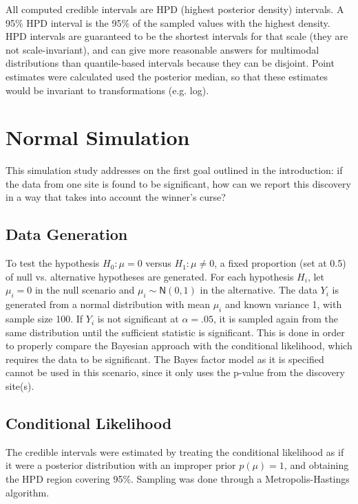 \documentclass[AMA,STIX1COL]{WileyNJD-v2}\usepackage[]{graphicx}\usepackage[]{color}
\begin{document}
All computed credible intervals are HPD (highest posterior density) intervals. A 95\% HPD interval is the 95\% of the sampled values with the highest density. HPD intervals are guaranteed to be the shortest intervals for that scale (they are not scale-invariant), and can give more reasonable answers for multimodal distributions than quantile-based intervals because they can be disjoint. Point estimates were calculated used the posterior median, so that these estimates would be invariant to transformations (e.g. log).

\section{Normal Simulation}\label{sec:normal}

This simulation study addresses on the first goal outlined in the introduction: if the data from one site is found to be significant, how can we report this discovery in a way that takes into account the winner's curse? 

\subsection{Data Generation}

To test the hypothesis $H_0: \mu = 0$ versus  $H_1: \mu \neq 0$, a fixed proportion (set at 0.5) of null vs. alternative hypotheses are generated. For each hypothesis $H_i$, let $\mu_i = 0$ in the null scenario and $\mu_i \sim \textsf{N}(0,1)$ in the alternative. The data $Y_i$ is generated from a normal distribution with mean $\mu_i$ and known variance 1, with sample size 100. If $Y_i$ is not significant at $\alpha = .05$, it is sampled again from the same distribution until the sufficient statistic is significant. This is done in order to properly compare the Bayesian approach with the conditional likelihood, which requires the data to be significant. The Bayes factor model as it is specified cannot be used in this scenario, since it only uses the p-value from the discovery site(s).

\subsection{Conditional Likelihood}

The credible intervals were estimated by treating the conditional likelihood as if it were a posterior distribution with an improper prior $p(\mu) = 1$, and obtaining the HPD region covering 95\%. Sampling was done through a Metropolis-Hastings algorithm.
\end{document}
